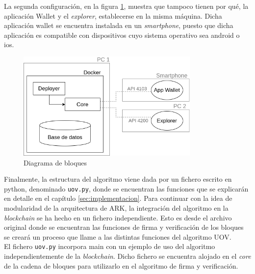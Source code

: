 La segunda configuración, en la figura \ref{fig:diag-bloques-3}, muestra que tampoco tienen por qué, la aplicación Wallet y el \textit{explorer}, establecerse en la misma máquina. Dicha aplicación wallet se encuentra instalada en un \textit{smartphone}, puesto que dicha aplicación es compatible con dispositivos cuyo sistema operativo sea android o \acrshort{ios}.\\

\begin{figure}[H]
	\centering
	\includegraphics[width=0.8\textwidth]{figuras/diagrama_bloquesARK3.png}
	\caption{Diagrama de bloques}
	\label{fig:diag-bloques-3}
\end{figure}


Finalmente, la estructura del algoritmo viene dada por un fichero escrito en python, denominado \texttt{uov.py}, donde se encuentran las funciones que se explicarán en detalle en el capítulo \ref{sec:implementacion}. Para continuar con la idea de modularidad de la arquitectura de ARK, la integración del algoritmo en la \textit{blockchain} se ha hecho en un fichero independiente. Esto es desde el archivo original donde se encuentran las funciones de firma y verificación de los bloques se creará un proceso que llame a las distintas funciones del algoritmo UOV.\\

El fichero \texttt{uov.py} incorpora main con un ejemplo de uso del algoritmo independientemente de la \textit{blockchain}. Dicho fichero se encuentra alojado en el \textit{core} de la cadena de bloques para utilizarlo en el algoritmo de firma y verificación.\\